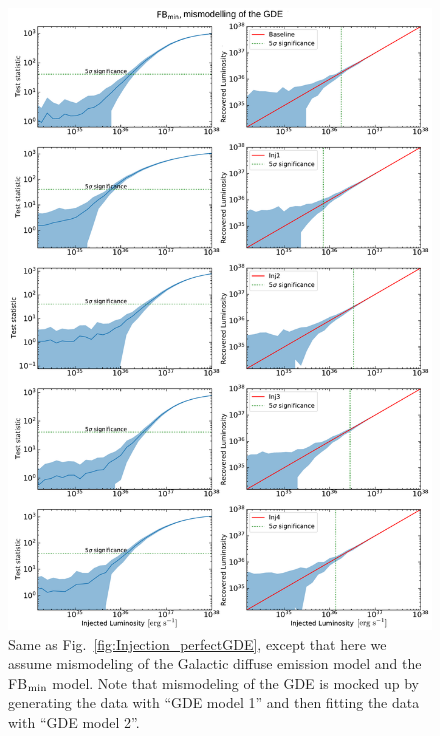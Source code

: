 \documentclass[doublespace,nopageskip]{VTthesis} %
\begin{document}
\begin{figure}
    \begin{center}
    \includegraphics[scale = 0.42]{Figures/CTA/all-TS-mis-True-Fermi-min-True.pdf}
    \caption{Same as Fig.~\ref{fig:Injection_perfectGDE}, except that here we assume mismodeling of the Galactic diffuse emission model and the FB$_{\rm min}$ model. Note that mismodeling of the GDE is mocked up by generating the data with ``GDE model 1'' and then fitting the data with ``GDE model 2''. }\label{fig:InjectionmismodelingFBmin}
    \end{center}
    \end{figure}
\end{document}
